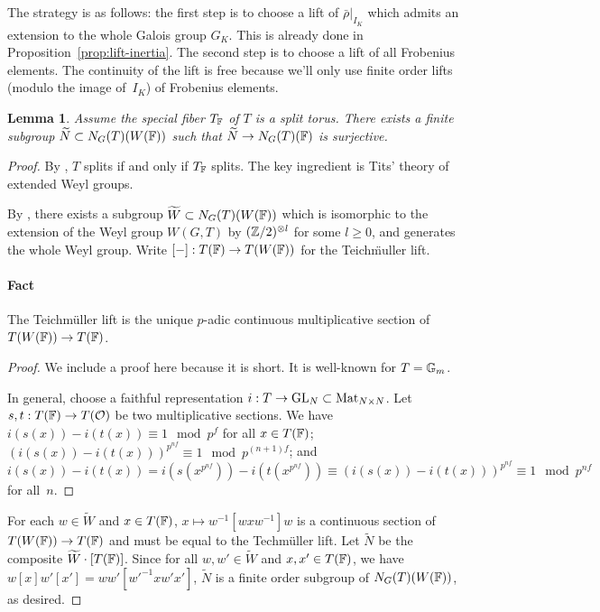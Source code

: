 \documentclass[10pt,a4paper,twoside]{article}
\newtheorem{lem}{Lemma}
\begin{document}
\subsection{}

The strategy is as follows: 
the first step is to choose a lift of $\bar\rho|_{I_K}$
which admits an extension to the whole Galois group $G_K$.
This is already done in Proposition~\ref{prop:lift-inertia}.
The second step is to choose a lift of all Frobenius elements.
The continuity of the lift is free because we'll
only use
finite order lifts (modulo the image of~$I_K$) of Frobenius elements.


\begin{lem}
\label{lem:extended-ng}
Assume the special fiber $T_{{\mathbb{F}}}$ of $T$
is a split torus.
There exists a finite subgroup $\widetilde{N} \subset N_G(T)(W({\mathbb{F}}))$
such that $\widetilde{N} \to N_G(T)({\mathbb{F}})$ is surjective.
\end{lem}

\begin{proof}
By \cite[B.3.5]{Crd14}, $T$ splits if and only if $T_{{\mathbb{F}}}$ splits.
The key ingredient is Tits' theory of
extended Weyl groups.

By \cite{Ti66}, there exists a subgroup $\widetilde{W}\subset N_G(T)(W({\mathbb{F}}))$ which is isomorphic to
the extension of the Weyl group $W(G,T)$ by $({\mathbb{Z}}/2)^{\otimes l}$ for some $l\ge 0$,
and generates the whole Weyl group.
Write $[-]: T({\mathbb{F}}) \to T(W({\mathbb{F}}))$ for the Teich\"muller lift.


\paragraph{\bf Fact}
The Teichm\"uller lift is the unique $p$-adic continuous multiplicative section of $T(W({\mathbb{F}}))\to T({\mathbb{F}})$.

\begin{proof}
We include a proof here because it is short.
It is well-known for $T=\mathbb{G}_m$. 

In general, choose a faithful representation $i:T \to \operatorname{GL}_N \subset \operatorname{Mat}_{N\times N}$.
Let $s,t: T({\mathbb{F}}) \to T(\mathcal{O})$ be two multiplicative sections.
We have $i(s(x)) - i(t(x)) \equiv 1 \mod p^f$ for all $x\in  T({\mathbb{F}})$;
$(i(s(x)) - i(t(x)))^{p^{nf}} \equiv 1 \mod p^{(n+1)f}$; and
$i(s(x)) - i(t(x)) = i(s(x^{p^{nf}})) - i(t(x^{p^{nf}})) \equiv (i(s(x)) - i(t(x)))^{p^{nf}} \equiv 1 \mod p^{nf}$ for all~$n$.
\end{proof}

For each $w \in \widetilde{W}$ and $x\in T({\mathbb{F}})$,
$x\mapsto w^{-1}[wxw^{-1}]w$ is a continuous section of $T(W({\mathbb{F}}))\to T({\mathbb{F}})$
and must be equal to the Techm\"uller lift.
Let $\widetilde{N}$ be the composite $\widetilde{W}\cdot [T({\mathbb{F}})]$.
Since for all $w,w'\in \widetilde{W}$ and $x,x'\in T({\mathbb{F}})$, we have
$w[x]w'[x'] = ww'[w'^{-1}xw'x']$, $\widetilde{N}$ is a finite order subgroup of
$N_G(T)(W({\mathbb{F}}))$, as desired.
\end{proof}
\end{document}
